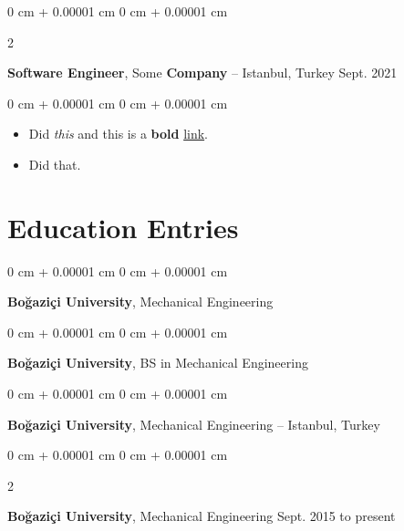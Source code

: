 \documentclass[10pt, letterpaper]{article}
\newenvironment{highlights}{
    \begin{itemize}[
        topsep=0.10 cm,
        parsep=0.10 cm,
        partopsep=0pt,
        itemsep=0pt,
        leftmargin=0 cm + 10pt
    ]
}{
    \end{itemize}
        
    \vspace{-0.10cm}
} %
\newenvironment{onecolentry}{
    \begin{adjustwidth}{
        0 cm + 0.00001 cm
    }{
        0 cm + 0.00001 cm
    }
}{
    \end{adjustwidth}
} %
\newenvironment{twocolentry}[2][]{
    \onecolentry
    \def\secondColumn{#2}
    \setcolumnwidth{\fill, 4.1 cm}
    \begin{paracol}{2}
}{
    \switchcolumn \raggedleft \secondColumn
    \end{paracol}
    \endonecolentry
} %
\begin{document}
        \begin{twocolentry}{
            Sept. 2021
        }
            \textbf{Software Engineer}, Some \textbf{Company} -- Istanbul, Turkey\end{twocolentry}

        \vspace{0.10 cm}
        \begin{onecolentry}
            \begin{highlights}
                \item Did \textit{this} and this is a \textbf{bold} \href{https://example.com}{link}.
                \item Did that.
            \end{highlights}
        \end{onecolentry}



    
    \section{Education Entries}

        
        \begin{onecolentry}
            \textbf{Boğaziçi University}, Mechanical Engineering\end{onecolentry}

        \vspace{0.10 cm}


        \vspace{0.15 cm}

        \begin{onecolentry}
            \textbf{Boğaziçi University}, BS in Mechanical Engineering\end{onecolentry}

        \vspace{0.10 cm}


        \vspace{0.15 cm}

        \begin{onecolentry}
            \textbf{Boğaziçi University}, Mechanical Engineering -- Istanbul, Turkey\end{onecolentry}

        \vspace{0.10 cm}


        \vspace{0.15 cm}

        \begin{twocolentry}{
            Sept. 2015 to present
        }
            \textbf{Boğaziçi University}, Mechanical Engineering\end{twocolentry}
\end{document}
